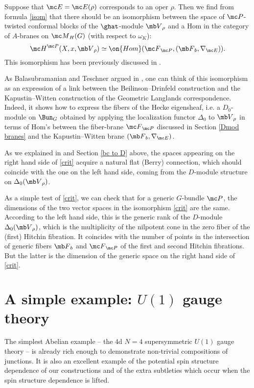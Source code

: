 \documentclass[11pt,reqno]{amsart}
\theoremstyle{plain}
\numberwithin{equation}{section}
\theoremstyle{definition}
\begin{document}
Suppose that ${\mc E} = {\mc E}(\rho)$ corresponds to an oper $\rho$.
Then we find from formula \eqref{isom} that there should be an
isomorphism between the space of ${\mc P}$-twisted conformal blocks of
the $\ghat$-module ${\mb V}_\rho$ and a Hom in the category of
$A$-branes on ${\mc M}_H(G)$ (with respect to $\omega_K$):
\begin{equation}    \label{crit}
{\mc H}^{\mc P}(X,x,{\mb V}_\rho) \simeq
\on{Hom}({\mc F}_{\mc P},({\mb F}_b,\nabla_{\mc E})).
\end{equation}
This isomorphism has been previously discussed in \cite{FW,BT}.

As Balasubramanian and Teschner argued in \cite{BT}, one can think of
this isomorphism as an expression of a link between the
Beilinson--Drinfeld construction and the Kapustin--Witten construction
of the Geometric Langlands correspondence. Indeed, it shows how to
express the fibers of the Hecke eigensheaf, i.e. a $D_0$-module on
$\Bun_G$ obtained by applying the localization functor $\Delta_0$ to
${\mb V}_\rho$ in terms of Hom's between the fiber-brane ${\mc F}_{\mc
  P}$ discussed in Section \ref{Dmod branes} and the Kapustin--Witten
brane $({\mb F}_b,\nabla_{\mc E})$.

As we explained in \cite{Ga1} and Section \ref{bc to D} above, the
spaces appearing on the right hand side of \eqref{crit} acquire a
natural flat (Berry) connection, which should coincide with the one on
the left hand side, coming from the $D$-module structure on
$\Delta_0({\mb V}_\rho)$.

As a simple test of \eqref{crit}, we can check that for a generic
$G$-bundle ${\mc P}$, the dimensions of the two vector spaces in the
isomorphism \eqref{crit} are the same. According to the left hand
side, this is the generic rank of the $D$-module $\Delta_0({\mb
  V}_\rho)$, which is the multiplicity of the nilpotent cone in the
zero fiber of the (first) Hitchin fibration. It coincides with the
number of points in the intersection of generic fibers ${\mb F}_b$ and
${\mc F}_{\mc P}$ of the first and second Hitchin fibrations. But
the latter is the dimension of the generic space on the right hand
side of \eqref{crit}.

\section{A simple example: $U(1)$ gauge theory}    \label{U1}

The simplest Abelian example -- the 4d $N=4$ supersymmetric $U(1)$
gauge theory -- is already rich enough to demonstrate non-trivial
compositions of junctions.  It is also an excellent example of the
potential spin structure dependence of our constructions and of the
extra subtleties which occur when the spin structure dependence is
lifted.
\end{document}
